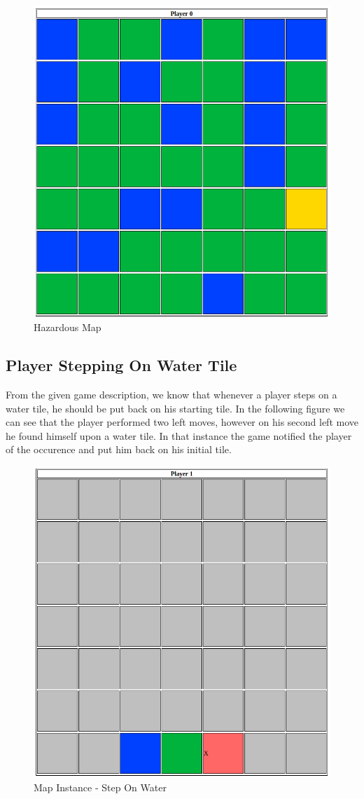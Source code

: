 \documentclass{article}
\begin{document}
    \begin{figure}[h]
        \centering
        \includegraphics[width=0.6\linewidth]{./Images/hazardous_map.png}
        \caption{Hazardous Map}
    \end{figure}

\clearpage


\subsection{Player Stepping On Water Tile}

\noindent
From the given game description, we know that whenever a player steps on a water tile, he should be put back on his starting tile. In the following figure we can see that the player performed two left moves, however on his second left move he found himself upon a water tile. In that instance the game notified the player of the occurence and put him back on his initial tile.

    
    \begin{figure}[h]
        \centering
        \includegraphics[width=0.7\linewidth]{./Images/player_1_lose_map.png}
        \caption{Map Instance - Step On Water}
    \end{figure}
\end{document}
